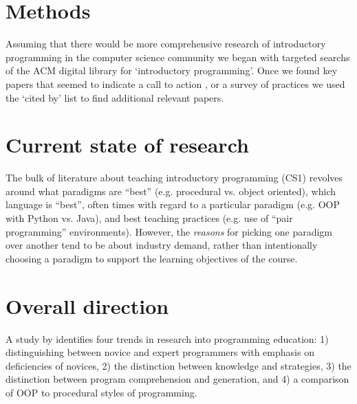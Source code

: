 \documentclass[12pt]{article}
\let\textcite=\autocite
\begin{document}
\section{Methods}
Assuming that there would be more comprehensive research of
introductory programming in the computer science community we began
with targeted searchs of the ACM digital library for `introductory
programming'. Once we found key papers that seemed to indicate a call
to action
\autocite[e.g.][]{mccracken_multinational_2001,kolling_problem_1999},
or a survey of practices
\autocite[e.g.][]{pears_survey_2007-1,robins_learning_2003} we used
the `cited by' list to find additional relevant papers.




\section{Current state of research}
The bulk of literature about teaching introductory programming (CS1)
revolves around what paradigms are “best” (e.g. procedural vs. object
oriented), which language is “best”, often times with regard to a
particular paradigm (e.g. OOP with Python vs. Java), and best teaching
practices (e.g. use of “pair programming” environments). However, the
\emph{reasons} for picking one paradigm over another tend to be about
industry demand, rather than intentionally choosing a paradigm to
support the learning objectives of the course.

\section{Overall direction}
A \citeyear{robins_learning_2003} study by
\citeauthor{robins_learning_2003} identifies four trends in research
into programming education: 1) distinguishing between novice and
expert programmers with emphasis on deficiencies of novices, 2) the
distinction between knowledge and strategies, 3) the distinction
between program comprehension and generation, and 4) a comparison of
OOP to procedural styles of programming\autocite{robins_learning_2003}.
\end{document}
